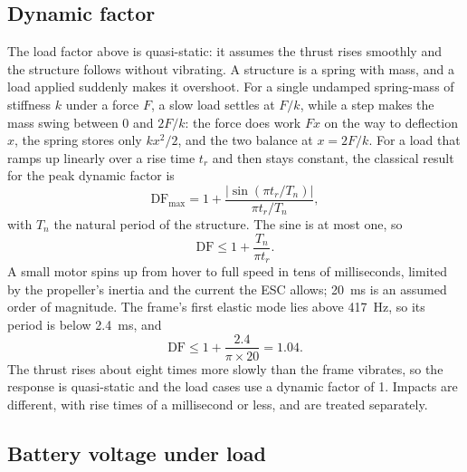 \subsection{Dynamic factor}

The load factor above is quasi-static: it assumes the thrust rises smoothly and the structure follows without vibrating. A structure is a spring with mass, and a load applied suddenly makes it overshoot. For a single undamped spring-mass of stiffness $k$ under a force $F$, a slow load settles at $F/k$, while a step makes the mass swing between 0 and $2F/k$: the force does work $Fx$ on the way to deflection $x$, the spring stores only $kx^2/2$, and the two balance at $x = 2F/k$. For a load that ramps up linearly over a rise time $t_r$ and then stays constant, the classical result for the peak dynamic factor is
\begin{equation}
\text{DF}_\text{max} = 1 + \frac{\left|\sin(\pi t_r / T_n)\right|}{\pi t_r / T_n},
\end{equation}
with $T_n$ the natural period of the structure. The sine is at most one, so
\begin{equation}
\text{DF} \leq 1 + \frac{T_n}{\pi t_r}.
\end{equation}
A small motor spins up from hover to full speed in tens of milliseconds, limited by the propeller's inertia and the current the ESC allows; \SI{20}{ms} is an assumed order of magnitude. The frame's first elastic mode lies above \SI{417}{Hz}, so its period is below \SI{2.4}{ms}, and
\begin{equation}
\text{DF} \leq 1 + \frac{2.4}{\pi \times 20} = 1.04.
\end{equation}
The thrust rises about eight times more slowly than the frame vibrates, so the response is quasi-static and the load cases use a dynamic factor of 1. Impacts are different, with rise times of a millisecond or less, and are treated separately.

\subsection{Battery voltage under load}\label{sec:loads-sag}

